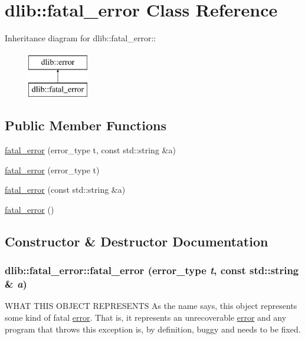 \hypertarget{classdlib_1_1fatal__error}{
\section{dlib::fatal\_\-error Class Reference}
\label{classdlib_1_1fatal__error}
}
Inheritance diagram for dlib::fatal\_\-error::\begin{figure}[H]
\begin{center}
\leavevmode
\includegraphics[height=2cm]{classdlib_1_1fatal__error}
\end{center}
\end{figure}
\subsection*{Public Member Functions}
\begin{DoxyCompactItemize}
\item 
\hyperlink{classdlib_1_1fatal__error_ae1ade5e6456e25e8b60ff532ed5e2e23}{fatal\_\-error} (error\_\-type t, const std::string \&a)
\item 
\hyperlink{classdlib_1_1fatal__error_ac947f78667e0aeba05ab738c3ab527d6}{fatal\_\-error} (error\_\-type t)
\item 
\hyperlink{classdlib_1_1fatal__error_a449542aaaf1cb427faa542bf369ca607}{fatal\_\-error} (const std::string \&a)
\item 
\hyperlink{classdlib_1_1fatal__error_ad824e88fda1a7e4e0fad7b147730dcfc}{fatal\_\-error} ()
\end{DoxyCompactItemize}


\subsection{Constructor \& Destructor Documentation}
\hypertarget{classdlib_1_1fatal__error_ae1ade5e6456e25e8b60ff532ed5e2e23}{
\subsubsection[{fatal\_\-error}]{\setlength{\rightskip}{0pt plus 5cm}dlib::fatal\_\-error::fatal\_\-error (error\_\-type {\em t}, \/  const std::string \& {\em a})}}
\label{classdlib_1_1fatal__error_ae1ade5e6456e25e8b60ff532ed5e2e23}
WHAT THIS OBJECT REPRESENTS As the name says, this object represents some kind of fatal \hyperlink{classdlib_1_1error}{error}. That is, it represents an unrecoverable \hyperlink{classdlib_1_1error}{error} and any program that throws this exception is, by definition, buggy and needs to be fixed.

